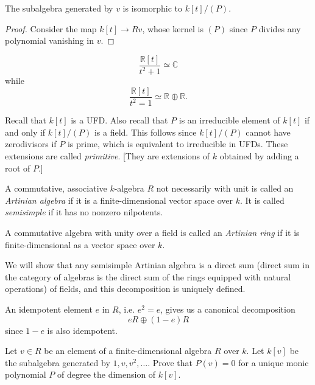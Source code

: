 \begin{lemma}
\label{lemma-subal-minim-polyn}
The subalgebra generated by $v$ is
isomorphic to $k[t]/(P)$.
\end{lemma}

\begin{proof}
Consider the map $k[t] \to Rv$,
whose kernel is $(P)$ since $P$ divides
any polynomial vanishing in $v$.
\end{proof}

\begin{example}
\label{example-subalgebras}
$$
\frac{\mathbb{R}[t]}{t^2+1}\simeq \mathbb{C}
$$
while
$$
\frac{\mathbb{R}[t]}{t^2=1}\simeq \mathbb{R}
\oplus \mathbb{R}.
$$


\end{example}

\medskip\noindent
Recall that $k[t]$ is a UFD.
Also recall that $P$ is an irreducible
element of $k[t]$ if and only if
$k[t]/(P)$ is a field.
This follows since $k[t]/(P)$ cannot
have zerodivisors if $P$ is prime,
which is equivalent to irreducible
in UFDs.
These extensions are called
{\it primitive}.
[They are extensions of $k$
obtained by adding a root of $P$.]

\begin{definition}
\label{definition-artinian-algebra}
A commutative, associative $k$-algebra $R$
not necessarily with unit
is called an {\it Artinian algebra} if it is
a finite-dimensional vector space over $k$.
It is called {\it semisimple}
if it has no nonzero nilpotents.

A commutative algebra with unity over a field
is called an {\it Artinian ring} if it is
finite-dimensional
as a vector space over $k$.
\end{definition}

\noindent
We will show that any semisimple
Artinian algebra
is a direct sum (direct sum in
the category of algebras is
the direct sum of the rings
equipped with natural operations)
of fields, and this decomposition
is uniquely defined.

An idempotent element $e$ in $R$,
i.e. $e^2=e$,
gives us a canonical decomposition
$$
eR \oplus (1-e)R
$$
since $1-e$ is also idempotent.

\begin{exercise}
\label{exercise-minimal-polynomial}
Let $v \in R$ be an element of a
finite-dimensional algebra $R$ over $k$.
Let $k[v]$ be the subalgebra generated by $1,
v, v^2,…$.
Prove that $P(v)=0$ for a unique monic
polynomial $P$ of degree
the dimension of $k[v]$.
\end{exercise}

